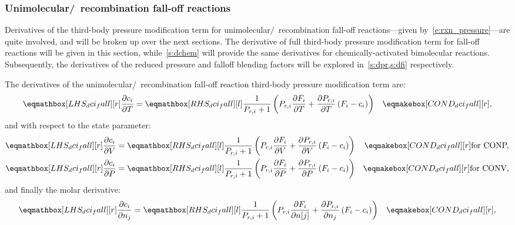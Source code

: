 \documentclass[12pt,number,sort&compress]{elsarticle}
\newcommand{\conp}{CONP}
\newcommand{\conv}{CONV}
\newcommand{\dconp}{\ifmmode\text{for \conp,}\else for \conp,\fi}
\newcommand{\dconv}{\ifmmode\text{for \conv,}\else for \conv,\fi}
\begin{document}
\subsubsection{Unimolecular\slash~recombination fall-off reactions}
\label{s:dfall}
Derivatives of the third-body pressure modification term for unimolecular\slash~recombination fall-off reactions---given by~\cref{e:rxn_pressure}---are quite involved, and will be broken up over the next sections.
The derivative of full third-body pressure modification term for fall-off reactions will be given in this section, while~\cref{s:dchem} will provide the same derivatives for chemically-activated bimolecular reactions.
Subsequently, the derivatives of the reduced pressure and falloff blending factors will be explored in~\cref{s:dpr,s:dfi} respectively.

The derivatives of the unimolecular\slash~recombination fall-off reaction third-body pressure modification term are:
\begin{align}
 \label{e:dci_fall_dt}
 \lhs{dci_fall}{\frac{\partial c_{i} }{\partial T }} &= \rhs{dci_fall}{\frac{1}{P_{r, i} + 1} \left(P_{r, i} \frac{\partial F_{i} }{\partial T } + \frac{\partial P_{r, i} }{\partial T } \left(F_{i} - c_{i}\right)\right)} & \cond{dci_fall}{,}
\end{align}
and with respect to the state parameter:
\begin{subequations}
 \label{e:dci_fall_de}
 \begin{align}
  \lhs{dci_fall}{\frac{\partial c_i }{\partial V }} &= \rhs{dci_fall}{\frac{1}{P_{r, i} + 1} \left(P_{r, i} \frac{\partial F_{i} }{\partial V } + \frac{\partial P_{r, i} }{\partial V } \left(F_{i} - c_{i}\right)\right)} & \cond{dci_fall}{\dconp} \\
  \lhs{dci_fall}{\frac{\partial c_i }{\partial P }} &= \rhs{dci_fall}{\frac{1}{P_{r, i} + 1} \left(P_{r, i} \frac{\partial F_{i} }{\partial P } + \frac{\partial P_{r, i} }{\partial P } \left(F_{i} - c_{i}\right)\right)} & \cond{dci_fall}{\dconv}
 \end{align}
\end{subequations}
and finally the molar derivative:
\begin{align}
 \label{e:dci_fall_dnj}
 \lhs{dci_fall}{\frac{\partial c_{i} }{\partial n_j}} &= \rhs{dci_fall}{\frac{1}{P_{r, i} + 1} \left(P_{r, i} \frac{\partial F_{i} }{\partial n[j] } + \frac{\partial P_{r, i} }{\partial n_j } \left(F_{i} - c_{i}\right)\right)} & \cond{dci_fall}{,}
\end{align}
\end{document}
